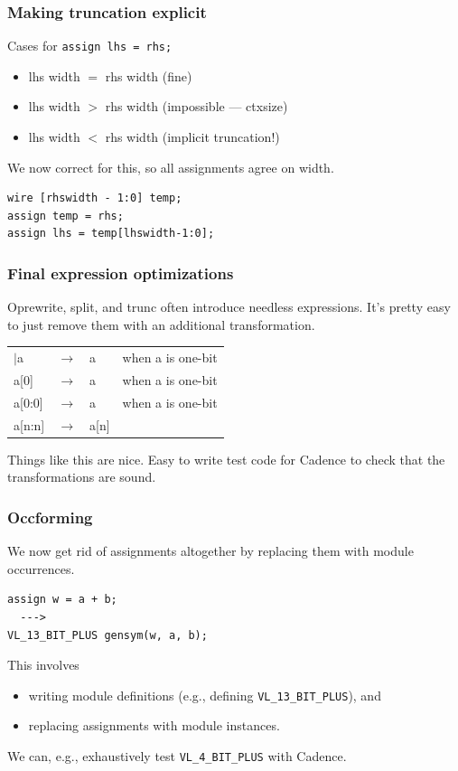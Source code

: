 \documentclass[mathserif]{beamer}
\begin{document}
\begin{frame}[fragile]
\frametitle{Making truncation explicit}

Cases for {\tt assign lhs = rhs;}
\begin{itemize}
\item lhs width $=$ rhs width (fine)
\item lhs width $>$ rhs width (impossible --- ctxsize)
\item lhs width $<$ rhs width (implicit truncation!)
\end{itemize}

\bigskip
We now correct for this, so all assignments agree on width.
\begin{verbatim}
wire [rhswidth - 1:0] temp;
assign temp = rhs;
assign lhs = temp[lhswidth-1:0];
\end{verbatim}

\end{frame}


\begin{frame}[fragile]
\frametitle{Final expression optimizations}

Oprewrite, split, and trunc often introduce needless expressions.  It's pretty easy
to just remove them with an additional transformation.

\begin{center}
\begin{tabular}{llll}
$|$a     & $\rightarrow$  & a & when a is one-bit \\
a[0]   & $\rightarrow$  & a & when a is one-bit \\
a[0:0] & $\rightarrow$  & a & when a is one-bit \\
a[n:n] & $\rightarrow$  & a[n] \\
\end{tabular}
\end{center}

Things like this are nice.  Easy to write test code for Cadence to check that
the transformations are sound.

\end{frame}


\begin{frame}[fragile]
\frametitle{Occforming}

We now get rid of assignments altogether by replacing them with module
occurrences.

\begin{verbatim}
assign w = a + b;
  ---> 
VL_13_BIT_PLUS gensym(w, a, b);
\end{verbatim}

This involves
\begin{itemize}
\item writing module definitions (e.g., defining \texttt{VL\_13\_BIT\_PLUS}), and
\item replacing assignments with module instances.
\end{itemize}

\bigskip
We can, e.g., exhaustively test \texttt{VL\_4\_BIT\_PLUS} with Cadence.

\end{frame}
\end{document}
